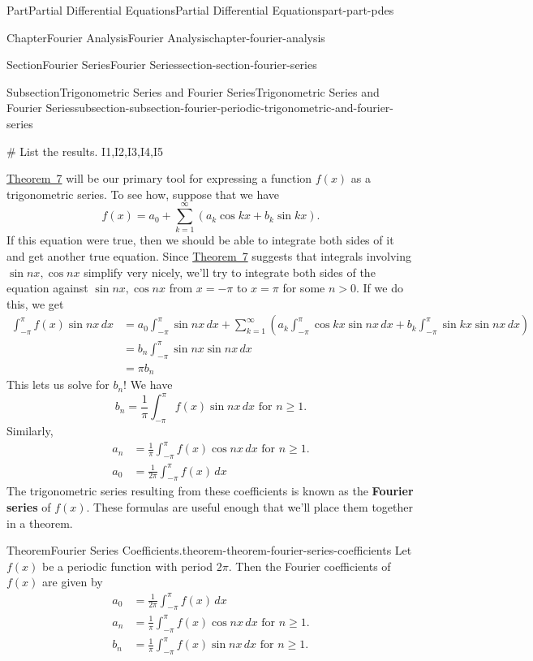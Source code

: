 \documentclass[twoside,10pt,]{book}
\newcommand{\terminology}[1]{\textbf{#1}}
\numberwithin{equation}{part}
\newcommand{\amp}{&}
\begin{document}
\begin{partptx}{Part}{Partial Differential Equations}{}{Partial Differential Equations}{}{}{part-part-pdes}
\begin{chapterptx}{Chapter}{Fourier Analysis}{}{Fourier Analysis}{}{}{chapter-fourier-analysis}
\begin{sectionptx}{Section}{Fourier Series}{}{Fourier Series}{}{}{section-section-fourier-series}
\begin{subsectionptx}{Subsection}{Trigonometric Series and Fourier Series}{}{Trigonometric Series and Fourier Series}{}{}{subsection-subsection-fourier-periodic-trigonometric-and-fourier-series}
\begin{sageinput}
# List the results.
I1,I2,I3,I4,I5
\end{sageinput}
\hyperref[theorem-theorem-orthogonality-relations]{Theorem~7} will be our primary tool for expressing a function \(f(x)\) as a trigonometric series. To see how, suppose that we have%
\begin{equation*}
f(x) = a_{0} + \sum_{k=1}^{\infty}(a_{k}\cos kx+b_{k}\sin kx).
\end{equation*}
If this equation were true, then we should be able to integrate both sides of it and get another true equation. Since \hyperref[theorem-theorem-orthogonality-relations]{Theorem~7} suggests that integrals involving \(\sin nx,\cos nx\) simplify very nicely, we'll try to integrate both sides of the equation against \(\sin nx,\cos nx\) from \(x=-\pi\) to \(x=\pi\) for some \(n>0\). If we do this, we get%
\begin{align*}
\int_{-\pi}^{\pi}f(x)\sin nx\,dx \amp = a_{0}\int_{-\pi}^{\pi}\sin nx\,dx + \sum_{k=1}^{\infty}\left(a_{k}\int_{-\pi}^{\pi}\cos kx\sin nx\,dx + b_{k}\int_{-\pi}^{\pi}\sin kx\sin nx\,dx\right)\\
\amp = b_{n}\int_{-\pi}^{\pi}\sin nx \sin nx \,dx\\
\amp = \pi b_{n}
\end{align*}
This lets us solve for \(b_{n}\)! We have%
\begin{equation*}
b_{n} = \frac{1}{\pi}\int_{-\pi}^{\pi}f(x)\sin nx\,dx\text{ for $n\geq 1$.}
\end{equation*}
Similarly,%
\begin{align*}
a_{n} \amp = \frac{1}{\pi}\int_{-\pi}^{\pi}f(x)\cos nx\,dx\text{ for $n\geq1$.}\\
a_{0} \amp = \frac{1}{2\pi}\int_{-\pi}^{\pi}f(x)\,dx
\end{align*}
The trigonometric series resulting from these coefficients is known as the \terminology{Fourier series} of \(f(x)\). These formulas are useful enough that we'll place them together in a theorem.%
\begin{theorem}{Theorem}{Fourier Series Coefficients.}{}{theorem-theorem-fourier-series-coefficients}%
%
Let \(f(x)\) be a periodic function with period \(2\pi\). Then the Fourier coefficients of \(f(x)\) are given by%
\begin{align*}
a_{0} \amp= \frac{1}{2\pi}\int_{-\pi}^{\pi}f(x)\,dx\\
a_{n} \amp = \frac{1}{\pi}\int_{-\pi}^{\pi}f(x)\cos nx\,dx\text{ for $n\geq1$.}\\
b_{n} \amp= \frac{1}{\pi}\int_{-\pi}^{\pi}f(x)\sin nx\,dx\text{ for $n\geq 1$.}

\end{align*}
\end{theorem}
\end{subsectionptx}
\end{sectionptx}
\end{chapterptx}
\end{partptx}
\end{document}
